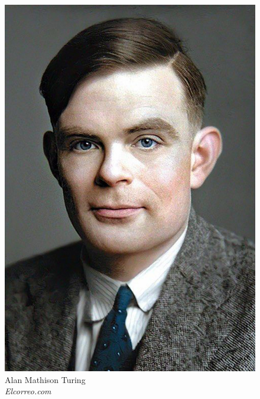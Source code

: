 \begin{frame}[t,fragile]
{\begin{minipage}[t]{\textwidth}
\begin{minipage}[t]{0.4\textwidth}
\begin{figure}[ht]
				    \includegraphics[width=.6\textwidth]{img/alan-turing-color.png}
				    {\tiny\\Alan Mathison Turing\\\vspace*{-1pt}\textit{\textcopyright Elcorreo.com}}
			    \end{figure}
		    \end{minipage}
	    \end{minipage}
    }
\end{frame}
%
